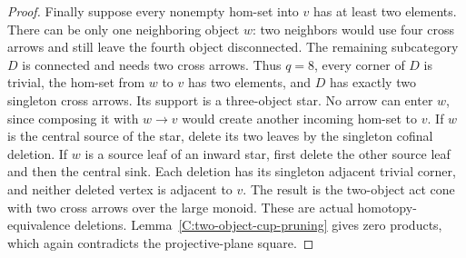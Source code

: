 \begin{proof}
Finally suppose every nonempty hom-set into $v$ has at least
two elements.  There can be only one neighboring object $w$:
two neighbors would use four cross arrows and still leave the
fourth object disconnected.  The remaining subcategory $D$ is
connected and needs two cross arrows.  Thus $q=8$, every corner
of $D$ is trivial, the hom-set from $w$ to $v$ has two elements,
and $D$ has exactly two singleton cross arrows.  Its support is
a three-object star.  No arrow can enter $w$, since composing it
with $w\to v$ would create another incoming hom-set to $v$.
If $w$ is the central source of the star, delete its two leaves
by the singleton cofinal deletion.  If $w$ is a source leaf of
an inward star, first delete the other source leaf and then the
central sink.  Each deletion has its singleton adjacent trivial
corner, and neither deleted vertex is adjacent to $v$.
The result is the two-object act cone with two cross arrows over
the large monoid.  These are actual homotopy-equivalence deletions.
Lemma~\ref{C:two-object-cup-pruning} gives zero products, which
again contradicts the projective-plane square.
\end{proof}
